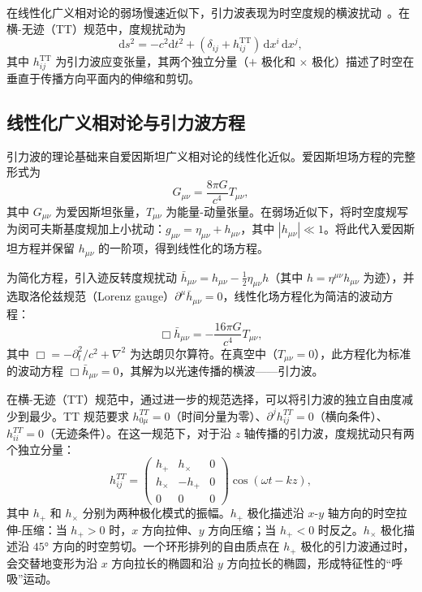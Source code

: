 在线性化广义相对论的弱场慢速近似下，引力波表现为时空度规的横波扰动~\cite{Einstein1916GW}。在横-无迹（TT）规范中，度规扰动为
\begin{equation}
  \mathrm{d}s^2 = -c^2\mathrm{d}t^2 + (\delta_{ij} + h_{ij}^{\mathrm{TT}})\,\mathrm{d}x^i\,\mathrm{d}x^j,
\end{equation}
其中 $h_{ij}^{\mathrm{TT}}$ 为引力波应变张量，其两个独立分量（$+$ 极化和 $\times$ 极化）描述了时空在垂直于传播方向平面内的伸缩和剪切。

\subsection{线性化广义相对论与引力波方程}

引力波的理论基础来自爱因斯坦广义相对论的线性化近似。爱因斯坦场方程的完整形式为
\begin{equation}
  G_{\mu\nu} = \frac{8\pi G}{c^4} T_{\mu\nu},
\end{equation}
其中 $G_{\mu\nu}$ 为爱因斯坦张量，$T_{\mu\nu}$ 为能量-动量张量。在弱场近似下，将时空度规写为闵可夫斯基度规加上小扰动：$g_{\mu\nu} = \eta_{\mu\nu} + h_{\mu\nu}$，其中 $|h_{\mu\nu}| \ll 1$。将此代入爱因斯坦方程并保留 $h_{\mu\nu}$ 的一阶项，得到线性化的场方程。

为简化方程，引入迹反转度规扰动 $\bar{h}_{\mu\nu} = h_{\mu\nu} - \frac{1}{2}\eta_{\mu\nu}h$（其中 $h = \eta^{\mu\nu}h_{\mu\nu}$ 为迹），并选取洛伦兹规范（Lorenz gauge）$\partial^\mu \bar{h}_{\mu\nu} = 0$，线性化场方程化为简洁的波动方程：
\begin{equation}
  \Box \bar{h}_{\mu\nu} = -\frac{16\pi G}{c^4} T_{\mu\nu},
\end{equation}
其中 $\Box = -\partial_t^2/c^2 + \nabla^2$ 为达朗贝尔算符。在真空中（$T_{\mu\nu} = 0$），此方程化为标准的波动方程 $\Box \bar{h}_{\mu\nu} = 0$，其解为以光速传播的横波——引力波。

在横-无迹（TT）规范中，通过进一步的规范选择，可以将引力波的独立自由度减少到最少。TT 规范要求 $h_{0\mu}^{TT} = 0$（时间分量为零）、$\partial^j h_{ij}^{TT} = 0$（横向条件）、$h_{ii}^{TT} = 0$（无迹条件）。在这一规范下，对于沿 $z$ 轴传播的引力波，度规扰动只有两个独立分量：
\begin{equation}
  h_{ij}^{TT} = \begin{pmatrix} h_+ & h_\times & 0 \\ h_\times & -h_+ & 0 \\ 0 & 0 & 0 \end{pmatrix} \cos(\omega t - kz),
\end{equation}
其中 $h_+$ 和 $h_\times$ 分别为两种极化模式的振幅。$h_+$ 极化描述沿 $x$-$y$ 轴方向的时空拉伸-压缩：当 $h_+ > 0$ 时，$x$ 方向拉伸、$y$ 方向压缩；当 $h_+ < 0$ 时反之。$h_\times$ 极化描述沿 $45°$ 方向的时空剪切。一个环形排列的自由质点在 $h_+$ 极化的引力波通过时，会交替地变形为沿 $x$ 方向拉长的椭圆和沿 $y$ 方向拉长的椭圆，形成特征性的“呼吸”运动。

